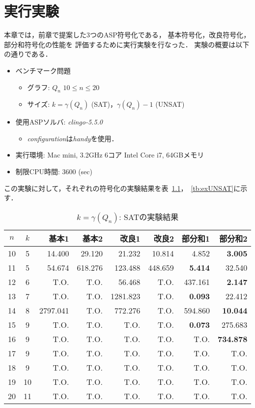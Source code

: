 \chapter{実行実験}\label{chap:experiment}
本章では，前章で提案した3つのASP符号化である，
基本符号化，改良符号化，部分和符号化の性能を
評価するために実行実験を行なった．
実験の概要は以下の通りである．
\begin{itemize}
 \item ベンチマーク問題
 \begin{itemize}
      \item グラフ: $Q_{n}$ $10 \le n \le 20$ 
      \item サイズ: $ k = \gamma(Q_n)$ (SAT)，$\gamma(Q_n)-1$ (UNSAT)%
 \end{itemize}
 \item 使用ASPソルバ: \textit{clingo-5.5.0}
       \begin{itemize}
	\item \textit{configuration}は\textit{handy}を使用．
       \end{itemize}
 \item 実行環境: Mac mini, 3.2GHz 6コア Intel Core i7, 64GBメモリ
 \item 制限CPU時間: 3600 (sec)
\end{itemize}

この実験に対して，それぞれの符号化の実験結果を表~\ref{tb:exSAT}，~\ref{tb:exUNSAT}に示す．
\begin{table}[ht]
 \caption{$k=\gamma(Q_n)$: SATの実験結果}
 \label{tb:exSAT}
 \centering
 \begin{tabular}{c|c|r|r|r|r|r|r} \hline
  $n$ & $k$ & 基本1 & 基本2 & 改良1 & 改良2 & 部分和1 & 部分和2 \\ \hline
  10 & 5 & 14.400 & 29.120 & 21.232 & 10.814 & 4.852 & \textbf{3.005} \\
  11 & 5 & 54.674 & 618.276 & 123.488 & 448.659 & \textbf{5.414} & 32.540 \\
  12 & 6 & T.O. & T.O. & 56.468 & T.O. & 437.161 & \textbf{2.147} \\
  13 & 7 & T.O. & T.O. & 1281.823 & T.O. & \textbf{0.093} & 22.412 \\
  14 & 8 & 2797.041 & T.O. & 772.276 & T.O. & 594.860 & \textbf{10.044}\\
  15 & 9 & T.O. & T.O. & T.O. & T.O. & \textbf{0.073} & 275.683 \\
  16 & 9 & T.O. & T.O. & T.O. & T.O. & T.O. & \textbf{734.878} \\
  17 & 9 & T.O. & T.O. & T.O. & T.O. & T.O. & T.O. \\
  18 & 9 & T.O. & T.O. & T.O. & T.O. & T.O. & T.O. \\
  19 & 10 & T.O. & T.O. & T.O. & T.O. & T.O. & T.O. \\
  20 & 11 & T.O. & T.O. & T.O. & T.O. & T.O. & T.O. \\ \hline
 \end{tabular}
\end{table}

